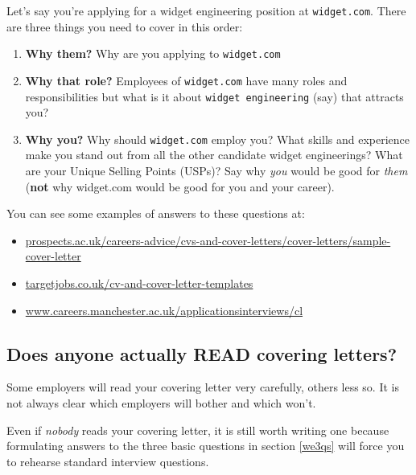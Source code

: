 \documentclass[
]{book}
\providecommand{\tightlist}{%
  \setlength{\itemsep}{0pt}\setlength{\parskip}{0pt}}
\begin{document}
Let's say you're applying for a widget engineering position at \texttt{widget.com}. There are three things you need to cover in this order:

\begin{enumerate}
\def\labelenumi{\arabic{enumi}.}
\tightlist
\item
  \textbf{Why them?} Why are you applying to \texttt{widget.com}
\item
  \textbf{Why that role?} Employees of \texttt{widget.com} have many roles and responsibilities but what is it about \texttt{widget\ engineering} (say) that attracts you?
\item
  \textbf{Why you?} Why should \texttt{widget.com} employ you? What skills and experience make you stand out from all the other candidate widget engineerings? What are your Unique Selling Points (USPs)? Say why \emph{you} would be good for \emph{them} (\textbf{not} why widget.com would be good for you and your career).
\end{enumerate}

You can see some examples of answers to these questions at:

\begin{itemize}
\tightlist
\item
  \href{https://www.prospects.ac.uk/careers-advice/cvs-and-cover-letters/cover-letters/sample-cover-letter}{prospects.ac.uk/careers-advice/cvs-and-cover-letters/cover-letters/sample-cover-letter}
\item
  \href{https://targetjobs.co.uk/cv-and-cover-letter-templates}{targetjobs.co.uk/cv-and-cover-letter-templates}
\item
  \href{https://www.careers.manchester.ac.uk/applicationsinterviews/cl/}{www.careers.manchester.ac.uk/applicationsinterviews/cl}
\end{itemize}

\hypertarget{elevatorpitch}{%
\subsection{Does anyone actually READ covering letters?}\label{elevatorpitch}}

Some employers will read your covering letter very carefully, others less so. It is not always clear which employers will bother and which won't.

Even if \emph{nobody} reads your covering letter, it is still worth writing one because formulating answers to the three basic questions in section \ref{we3qs} will force you to rehearse standard interview questions.
\end{document}
